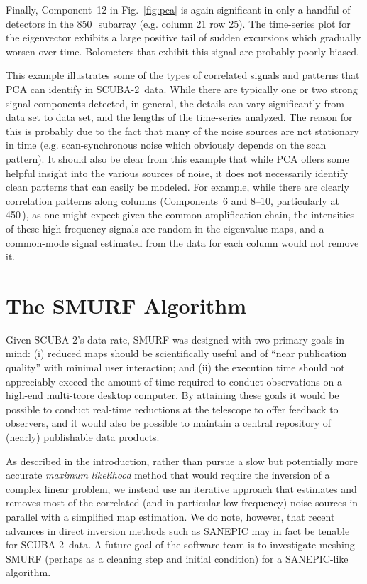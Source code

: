 \documentclass[useAMS,usenatbib,nofootinbib]{mn2e}
\newcommand{\scuba}{SCUBA-2}
\begin{document}
Finally, Component~12 in Fig.~\ref{fig:pca} is again significant in
only a handful of detectors in the 850\,\micron\ subarray (e.g. column
21 row 25). The time-series plot for the eigenvector exhibits a large
positive tail of sudden excursions which gradually worsen over
time. Bolometers that exhibit this signal are probably poorly biased.

This example illustrates some of the types of correlated signals and
patterns that PCA can identify in \scuba\ data. While there are
typically one or two strong signal components detected, in general,
the details can vary significantly from data set to data set, and the
lengths of the time-series analyzed. The reason for this is probably
due to the fact that many of the noise sources are not stationary in
time (e.g. scan-synchronous noise which obviously depends on the scan
pattern). It should also be clear from this example that while PCA
offers some helpful insight into the various sources of noise, it does
not necessarily identify clean patterns that can easily be
modeled. For example, while there are clearly correlation patterns
along columns (Components~6 and 8--10, particularly at 450\,\micron),
as one might expect given the common amplification chain, the
intensities of these high-frequency signals are random in the
eigenvalue maps, and a common-mode signal estimated from the data for
each column would not remove it.

\section{The SMURF Algorithm}
\label{sec:algorithm}


Given \scuba's data rate, SMURF was designed with two primary goals in
mind: (i) reduced maps should be scientifically useful and of ``near
publication quality'' with minimal user interaction; and (ii) the
execution time should not appreciably exceed the amount of time
required to conduct observations on a high-end multi-tcore desktop
computer. By attaining these goals it would be possible to conduct
real-time reductions at the telescope to offer feedback to observers,
and it would also be possible to maintain a central repository of
(nearly) publishable data products.

As described in the introduction, rather than pursue a slow but
potentially more accurate \emph{maximum likelihood} method that would
require the inversion of a complex linear problem, we instead use an
iterative approach that estimates and removes most of the correlated
(and in particular low-frequency) noise sources in parallel with a
simplified map estimation. We do note, however, that recent advances
in direct inversion methods such as SANEPIC \citep{patanchon2008} may
in fact be tenable for \scuba\ data. A future goal of the software
team is to investigate meshing SMURF (perhaps as a cleaning step and
initial condition) for a SANEPIC-like algorithm.
\end{document}
